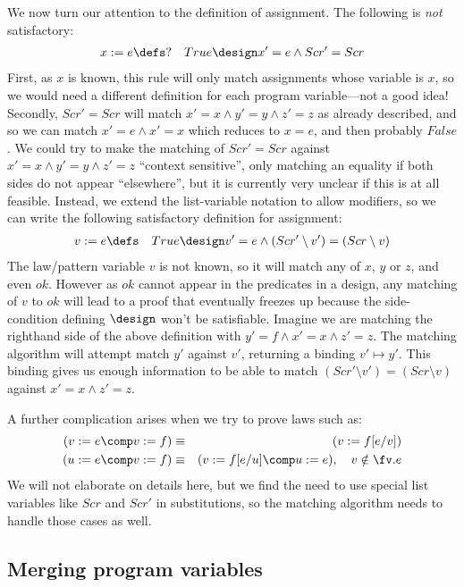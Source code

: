 We now turn our attention to the definition of assignment.
The following is \emph{not} satisfactory:
\begin{eqnarray*}
  x:=e &\defs?& True \design x' = e \land Scr'=Scr
\end{eqnarray*}
First, as $x$ is known, this rule will only match assignments whose
variable is $x$, so we would need a different definition for each program
variable---not a good idea!
Secondly, $Scr'=Scr$ will match $x'=x \land y'=y \land z'=z$
as already described, and so we can match $x'=e \land x'=x$
which reduces to $x=e$, and then probably $False$.
We could try to make the matching of $Scr'=Scr$ against
$x'=x \land y'=y \land z'=z$ ``context sensitive'',
only matching an equality if both sides do not appear ``elsewhere'',
but it is currently very unclear if this is at all feasible.
Instead, we extend the list-variable notation to allow modifiers,
so we can write the following satisfactory definition for assignment:
\begin{eqnarray*}
  v:=e &\defs& True \design v' = e \land (Scr'\setminus v')=(Scr\setminus v)
\end{eqnarray*}
The law/pattern variable $v$ is not known, so it will match any of $x$, $y$ or $z$,
and even $ok$.
However as $ok$ cannot appear in the predicates in a design,
any matching of $v$ to $ok$ will lead to a proof that eventually freezes
up because the side-condition defining $\design$ won't be satisfiable.
Imagine we are matching the righthand side of the above definition
with $y'=f \land x'=x \land z'=z$.
The matching algorithm will attempt match $y'$ against $v'$,
returning a binding $v' \mapsto y'$.
This binding gives us enough information
to be able to match
$(Scr'\setminus v')=(Scr\setminus v)$
against $x'=x \land z'=z$.

A further complication arises when we try to prove laws such
as:
\begin{eqnarray*}
   (v:=e \comp v:=f ) &\equiv&( v := f[e/v])
\\ (u:=e \comp v:=f) &\equiv& (v := f[e/u] \comp u := e),
    \quad v \notin \fv.e
\end{eqnarray*}
We will not elaborate on details here,
but we find the need to use special list variables like $Scr$ and $Scr'$
in substitutions, so the matching algorithm needs to handle those cases as well.

\subsection{Merging program variables}

